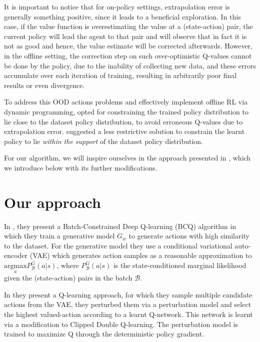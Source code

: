 It is important to notice that for on-policy settings, extrapolation error is generally something positive, since it
leads to a beneficial exploration. In this case, if the value function is overestimating the value at
a (state-action) pair, the current policy will lead the agent to that pair and will observe that in fact
it is not as good and hence, the value estimate will be corrected afterwards.
However, in the offline setting, the correction step on such over-optimistic Q-values cannot be done by the 
policy, due to the inability of collecting new data, and these errors accumulate over each iteration of training,
resulting in arbitrarily poor final results or even divergence.


To address this OOD actions problems and effectively implement offline RL via dynamic programming,
\citet{Fujimoto2018} opted for constraining the trained policy distribution to lie close to
the dataset policy distribution, to avoid erroneous Q-values due to extrapolation error.
\citet{Kumar2019} suggested a less restrictive solution to constrain the learnt policy to lie
\textit{within the support} of the dataset policy distribution.

For our algorithm, we will inspire ourselves in the approach presented in 
\citet{Fujimoto2019}, which we introduce below with its further modifications.


\section{Our approach} 
In \citet{Fujimoto2019}, they present a Batch-Constrained Deep Q-learning (BCQ)
algorithm in which they
train a generative model $G_w$ to generate actions with high similarity to the dataset.
For the generative model they use a conditional variational auto-encoder (VAE) \cite{Kingma2014} which
generates action samples as a reasonable approximation to
$\underset{a}{\text{argmax}}  P _\mathcal{B}^G(a|s)$, where $P_\mathcal{B}^G(a|s)$ is 
the state-conditioned marginal likelihood given the (state-action) pairs in the 
batch $\mathcal{B}$.

In \citet{Fujimoto2019} they present a Q-learning approach, for which
they sample multiple candidate actions from the VAE, they perturbed them via a perturbation model
and select the highest valued-action 
according to a learnt Q-network. This network is learnt via a modification to Clipped Double Q-learning.
The perturbation model is trained to maximize Q through the deterministic policy gradient.

